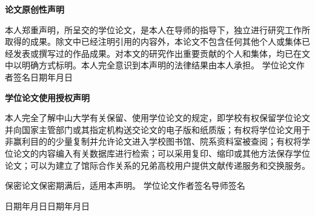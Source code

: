 \thispagestyle{empty}
\begin{center}
	\vspace*{20pt}
	\bfseries 论文原创性声明
\end{center}
\fontsize{15}{20}\selectfont

本人郑重声明，所呈交的学位论文，是本人在导师的指导下，独立进行研究工作所取得的成果。除文中已经注明引用的内容外，本论文不包含任何其他个人或集体已经发表或撰写过的作品成果。对本文的研究作出重要贡献的个人和集体，均已在文中以明确方式标明。本人完全意识到本声明的法律结果由本人承担。
\vskip 55pt
\noindent
学位论文作者签名\qquad\qquad\qquad\qquad 日期\qquad 年\quad 月\quad 日

\newclearpage
\thispagestyle{empty}

\begin{center}
	{\bfseries 学位论文使用授权声明}
\end{center}

本人完全了解中山大学有关保留、使用学位论文的规定，即学校有权保留学位论文并向国家主管部门或其指定机构送交论文的电子版和纸质版；有权将学位论文用于非赢利目的的少量复制并允许论文进入学校图书馆、院系资料室被查阅；有权将学位论文的内容编入有关数据库进行检索；可以采用复印、缩印或其他方法保存学位论文；可以为建立了馆际合作关系的兄弟高校用户提供文献传递服务和交换服务。

保密论文保密期满后，适用本声明。
\vskip 55pt
\noindent
学位论文作者签名\qquad\qquad\qquad\qquad 导师签名

\noindent
日期\qquad 年\quad 月\quad 日\qquad\qquad\qquad 日期\qquad 年\quad 月\quad 日

\endinput
